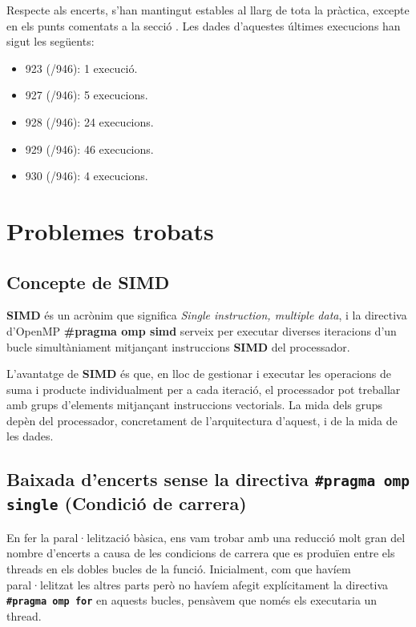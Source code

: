 \documentclass{article}
\begin{document}
Respecte als encerts, s'han mantingut estables al llarg de tota la pràctica, excepte en els punts comentats a la secció \texttt{}. Les dades d'aquestes últimes execucions han sigut les següents:

\begin{itemize}
    \item 923 (/946): 1 execució.
    \item 927 (/946): 5 execucions.
    \item 928 (/946): 24 execucions.
    \item 929 (/946): 46 execucions.
    \item 930 (/946): 4 execucions.
\end{itemize}



\newpage
\section{Problemes trobats}

\subsection{Concepte de SIMD}
\label{sec:simd_explanation}

\textbf{SIMD} és un acrònim que significa \textit{Single instruction, multiple data}, i la directiva d'OpenMP \textbf{\#pragma omp simd} serveix per executar diverses iteracions d'un bucle simultàniament mitjançant instruccions \textbf{SIMD} del processador.

L'avantatge de \textbf{SIMD} és que, en lloc de gestionar i executar les operacions de suma i producte individualment per a cada iteració, el processador pot treballar amb grups d'elements mitjançant instruccions vectorials. La mida dels grups depèn del processador, concretament de l'arquitectura d'aquest, i de la mida de les dades.

\subsection{Baixada d'encerts sense la directiva \textbf{\texttt{\#pragma omp single}} (Condició de carrera)}
\label{sec:error_spike}


\noindent En fer la paral·lelització bàsica, ens vam trobar amb una reducció molt gran del nombre d'encerts a causa de les condicions de carrera que es produïen entre els threads en els dobles bucles de la funció. Inicialment, com que havíem paral·lelitzat les altres parts però no havíem afegit explícitament la directiva \textbf{\texttt{\#pragma omp for}} en aquests bucles, pensàvem que només els executaria un thread.
\end{document}
